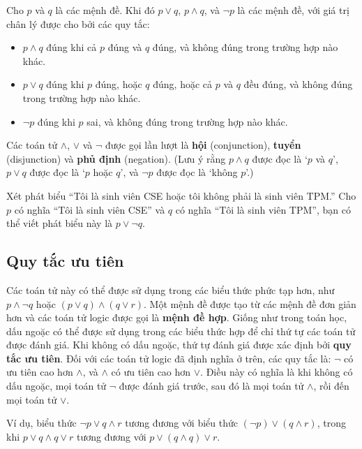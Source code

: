\begin{definition}
Cho $p$ và $q$ là các mệnh đề. Khi đó $p \lor q$, $p \land q$, và $\lnot p$ là các mệnh đề, với giá trị chân lý được cho bởi các quy tắc:
\begin{itemize}
\item $p \land q$ đúng khi cả $p$ đúng và $q$ đúng, và không đúng trong trường hợp nào khác.
\item $p \lor q$ đúng khi $p$ đúng, hoặc $q$ đúng, hoặc cả $p$ và $q$ đều đúng, và không đúng trong trường hợp nào khác.
\item $\lnot p$ đúng khi $p$ sai, và không đúng trong trường hợp nào khác.
\end{itemize}
Các toán tử $\land$, $\lor$ và $\lnot$ được gọi lần lượt là \textbf{hội} (conjunction), \textbf{tuyển} (disjunction) và \textbf{phủ định} (negation). (Lưu ý rằng $p \land q$ được đọc là `$p$ và $q$', $p \lor q$ được đọc là `$p$ hoặc $q$', và $\lnot p$ được đọc là `không $p$'.)
\end{definition}

\begin{notebox}
Xét phát biểu ``Tôi là sinh viên CSE hoặc tôi không phải là sinh viên TPM.'' Cho $p$ có nghĩa ``Tôi là sinh viên CSE'' và $q$ có nghĩa ``Tôi là sinh viên TPM'', bạn có thể viết phát biểu này là $p \lor \lnot q$.
\end{notebox}

\subsection{Quy tắc ưu tiên}

Các toán tử này có thể được sử dụng trong các biểu thức phức tạp hơn, như $p \land \lnot q$ hoặc $(p \lor q) \land (q \lor r)$. Một mệnh đề được tạo từ các mệnh đề đơn giản hơn và các toán tử logic được gọi là \textbf{mệnh đề hợp}. Giống như trong toán học, dấu ngoặc có thể được sử dụng trong các biểu thức hợp để chỉ thứ tự các toán tử được đánh giá. Khi không có dấu ngoặc, thứ tự đánh giá được xác định bởi \textbf{quy tắc ưu tiên}. Đối với các toán tử logic đã định nghĩa ở trên, các quy tắc là: $\lnot$ có ưu tiên cao hơn $\land$, và $\land$ có ưu tiên cao hơn $\lor$. Điều này có nghĩa là khi không có dấu ngoặc, mọi toán tử $\lnot$ được đánh giá trước, sau đó là mọi toán tử $\land$, rồi đến mọi toán tử $\lor$.

Ví dụ, biểu thức $\lnot p \lor q \land r$ tương đương với biểu thức $(\lnot p) \lor (q \land r)$, trong khi $p \lor q \land q \lor r$ tương đương với $p \lor (q \land q) \lor r$.

